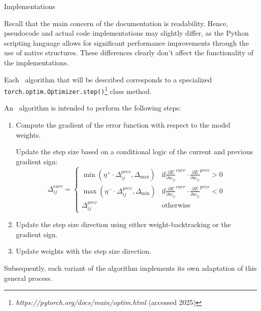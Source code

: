 \begin{section}{Implementations}
    \par Recall that the main concern of the documentation is readability. Hence, pseudocode and actual code implementations may slightly differ, as the Python scripting language allows for significant performance improvements through the use of native structures. These differences clearly don't affect the functionality of the implementations.
    \par Each~ algorithm that will be described corresponds to a specialized\\\texttt{torch.optim.Optimizer.step()}\footnote{\textit{https://pytorch.org/docs/main/optim.html} (accessed 2025)} class method.\\
    \par An~ algorithm is intended to perform the following steps:
    \begin{enumerate}
        \item Compute the gradient of the error function with respect to the model weights.
        \begin{item}
            Update the step size based on a conditional logic of the current and previous gradient sign:
            \[
                \Delta_{ij}^{curr} =
                \begin{cases}
                    \min(\eta^{+} \cdot \Delta_{ij}^{prev}, \Delta_{\max}) & \text{if} {\frac{\partial E}{\partial w_{ij}}}^{curr} \cdot {\frac{\partial E}{\partial w_{ij}}}^{prev} > 0 \\[2ex]
                    \max(\eta^{-} \cdot \Delta_{ij}^{prev}, \Delta_{\min}) & \text{if} {\frac{\partial E}{\partial w_{ij}}}^{curr} \cdot {\frac{\partial E}{\partial w_{ij}}}^{prev} < 0 \\[2ex]
                    \Delta_{ij}^{prev} & \text{otherwise}
                \end{cases}
            \]
        \end{item}
        \item Update the step size direction using either weight-backtracking or the gradient sign.
        \item Update weights with the step size direction.
    \end{enumerate}
    Subsequently, each variant of the algorithm implements its own adaptation of this general process.
    \clearpage
    
    
    
    
\end{section}